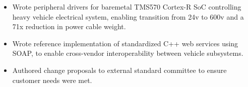 \begin{itemize}
    \item Wrote peripheral drivers for baremetal TMS570 Cortex-R SoC controlling heavy vehicle electrical system, enabling transition from 24v to 600v and a 71x reduction in power cable weight.
    \item Wrote reference implementation of standardized C++ web services using SOAP, to enable cross-vendor interoperability between vehicle subsystems.
    \item Authored change proposals to external standard committee to ensure customer needs were met.
\end{itemize}
